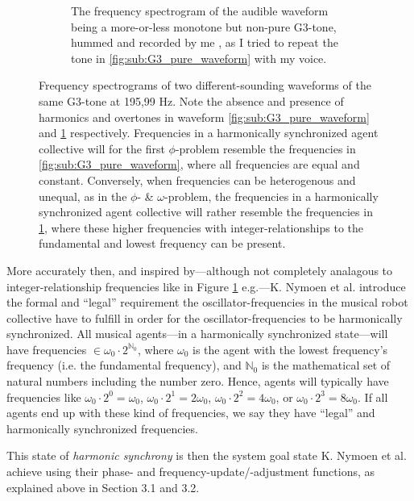 \begin{figure}[ht!]
\begin{subfigure}[t]{.5\textwidth}
					\caption{The frequency spectrogram of the audible waveform being a more-or-less monotone but non-pure G3-tone, hummed and recorded by me \cite{}, as I tried to repeat the tone in \ref{fig:sub:G3_pure_waveform} with my voice.}
					\label{fig:sub:G3_hummed_waveform}
				\end{subfigure}
			\caption[Frequency spectrograms illustrating the absence and presence of harmonics and overtones in audible waveforms]{Frequency spectrograms of two different-sounding waveforms of the same G3-tone at 195,99 Hz. Note the absence and presence of harmonics and overtones in waveform \ref{fig:sub:G3_pure_waveform} and \ref{fig:sub:G3_hummed_waveform} respectively. Frequencies in a harmonically synchronized agent collective will for the first $\phi$-problem resemble the frequencies in \ref{fig:sub:G3_pure_waveform}, where all frequencies are equal and constant. Conversely, when frequencies can be heterogenous and unequal, as in the $\phi$- \& $\omega$-problem, the frequencies in a harmonically synchronized agent collective will rather resemble the frequencies in \ref{fig:sub:G3_hummed_waveform}, where these higher frequencies with integer-relationships to the fundamental and lowest frequency can be present.}
			\label{fig:frequency_spectrograms}
		\end{figure}

		More accurately then, and inspired by—although not completely analagous to integer-relationship frequencies like in Figure \ref{fig:sub:G3_hummed_waveform} e.g.—K. Nymoen et al. introduce the formal and ``legal'' requirement the oscillator-frequencies in the musical robot collective have to fulfill in order for the oscillator-frequencies to be harmonically synchronized. All musical agents—in a harmonically synchronized state—will have frequencies $\in \omega_{0} \cdot 2^{\mathbb{N}_0}$, where $\omega_{0}$ is the agent with the lowest frequency's frequency (i.e. the fundamental frequency), and $\mathbb{N}_0$ is the mathematical set of natural numbers including the number zero. Hence, agents will typically have frequencies like $\omega_{0} \cdot 2^0 = \omega_{0}$, $\omega_{0} \cdot 2^1 = 2\omega_{0}$, $\omega_{0} \cdot 2^2 = 4\omega_{0}$, or $\omega_{0} \cdot 2^3 = 8\omega_{0}$. If all agents end up with these kind of frequencies, we say they have ``legal'' and harmonically synchronized frequencies.

		This state of \textit{harmonic synchrony} is then the system goal state K. Nymoen et al. achieve using their phase- and frequency-update/-adjustment functions, as explained above in Section 3.1 and 3.2.


